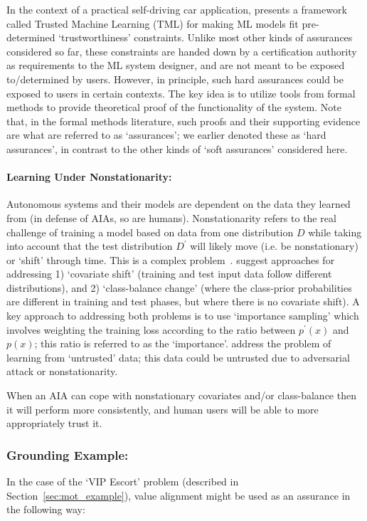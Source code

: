 In the context of a practical self-driving car application, \citet{Ghosh2016-dl} presents a framework called Trusted Machine Learning (TML) for making ML models fit pre-determined `trustworthiness' constraints. Unlike most other kinds of assurances considered so far, these constraints are handed down by a certification authority as requirements to the ML system designer, and are not meant to be exposed to/determined by users. However, in principle, such hard assurances could be exposed to users in certain contexts. The key idea is to utilize tools from formal methods to provide theoretical proof of the functionality of the system. Note that, in the formal methods literature, such proofs and their supporting evidence are what are referred to as `assurances'; we earlier denoted these as `hard assurances', in contrast to the other kinds of `soft assurances' considered here. 

\paragraph{Learning Under Nonstationarity:}
Autonomous systems and their models are dependent on the data they learned from (in defense of AIAs, so are humans). Nonstationarity refers to the real challenge of training a model based on data from one distribution $D$ while taking into account that the test distribution $D^\prime$ will likely move (i.e. be nonstationary) or `shift' through time. This is a complex problem~\cite{Quinonero-Candela2009-fj}. \citet{Sugiyama2013-ci} suggest approaches for addressing 1) `covariate shift' (training and test input data follow different distributions), and 2) `class-balance change' (where the class-prior probabilities are different in training and test phases, but where there is no covariate shift). A key approach to addressing both problems is to use `importance sampling' which involves weighting the training loss according to the ratio between $p^\prime(x)$ and $p(x)$; this ratio is referred to as the `importance'. \citet{Charikar2017-kr} address the problem of learning from `untrusted' data; this data could be untrusted due to adversarial attack or nonstationarity.

When an AIA can cope with nonstationary covariates and/or class-balance then it will perform more consistently, and human users will be able to more appropriately trust it.

\subsubsection{Grounding Example:}
In the case of the `VIP Escort' problem (described in Section~\ref{sec:mot_example}), value alignment might be used as an assurance in the following way:

